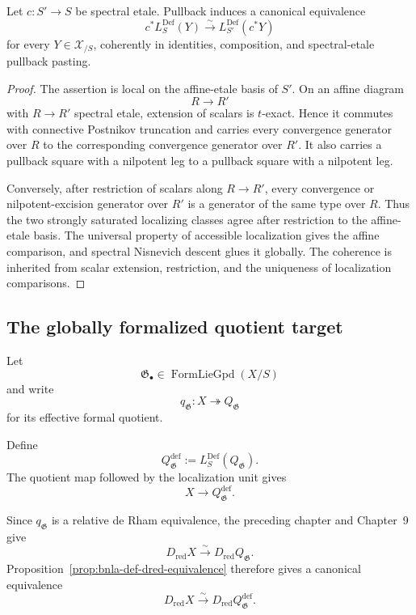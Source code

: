 \begin{theorem}
\label{thm:bnla-def-etale-base-change}
Let $c:S'\to S$ be spectral etale.  Pullback induces a canonical equivalence
\[
\boxed{
    c^*L^{\mathrm{Def}}_S(Y)
    \xrightarrow{\sim}
    L^{\mathrm{Def}}_{S'}(c^*Y)}
\]
for every $Y\in\mathcal X_{/S}$, coherently in identities, composition, and
spectral-etale pullback pasting.
\end{theorem}

\begin{proof}
The assertion is local on the affine-etale basis of $S'$.  On an affine
diagram
\[
    R\longrightarrow R'
\]
with $R\to R'$ spectral etale, extension of scalars is $t$-exact.  Hence it
commutes with connective Postnikov truncation and carries every convergence
generator over $R$ to the corresponding convergence generator over $R'$.
It also carries a pullback square with a nilpotent leg to a pullback square
with a nilpotent leg.

Conversely, after restriction of scalars along $R\to R'$, every convergence
or nilpotent-excision generator over $R'$ is a generator of the same type over
$R$.  Thus the two strongly saturated localizing classes agree after
restriction to the affine-etale basis.  The universal property of accessible
localization gives the affine comparison, and spectral Nisnevich descent glues
it globally.  The coherence is inherited from scalar extension, restriction,
and the uniqueness of localization comparisons.
\end{proof}

\subsection{The globally formalized quotient target}

Let
\[
    \mathfrak G_\bullet\in\operatorname{FormLieGpd}(X/S)
\]
and write
\[
    q_{\mathfrak G}:X\twoheadrightarrow Q_{\mathfrak G}
\]
for its effective formal quotient.

\begin{definition}
\label{def:bnla-artdef-formal-quotient}
Define
\[
\boxed{
    Q^{\mathrm{def}}_{\mathfrak G}
    :=
    L^{\mathrm{Def}}_S(Q_{\mathfrak G}).}
\]
The quotient map followed by the localization unit gives
\[
    X\longrightarrow Q^{\mathrm{def}}_{\mathfrak G}.
\]
\end{definition}

Since $q_{\mathfrak G}$ is a relative de Rham equivalence, the preceding
chapter and Chapter~9 give
\[
    D_{\mathrm{red}}X
    \xrightarrow{\sim}
    D_{\mathrm{red}}Q_{\mathfrak G}.
\]
Proposition~\ref{prop:bnla-def-dred-equivalence} therefore gives a canonical
equivalence
\[
    D_{\mathrm{red}}X
    \xrightarrow{\sim}
    D_{\mathrm{red}}Q^{\mathrm{def}}_{\mathfrak G}.
\]

